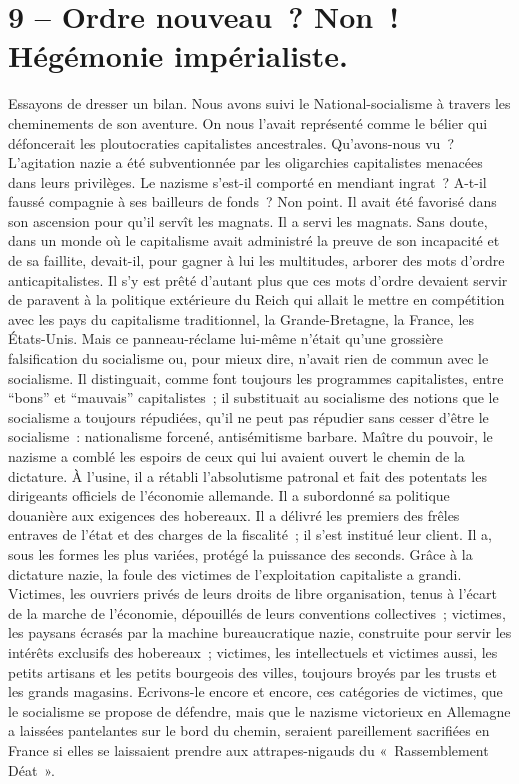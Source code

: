 \documentclass[french,twoside]{book} %
\newcommand\chapteropen{} %
\newcommand\chaptercont{} %
\begin{document}
\chapteropen
\chapter[{9 – Ordre nouveau ? Non ! Hégémonie impérialiste.}]{9 – Ordre nouveau ? Non ! Hégémonie impérialiste.}\renewcommand{\leftmark}{9 – Ordre nouveau ? Non ! Hégémonie impérialiste.}


\chaptercont
\noindent Essayons de dresser un bilan. Nous avons suivi le National-socialisme à travers les cheminements de son aventure. On nous l’avait représenté comme le bélier qui défoncerait les ploutocraties capitalistes ancestrales. Qu’avons-nous vu ? L’agitation nazie a été subventionnée par les oligarchies capitalistes menacées dans leurs privilèges. Le nazisme s’est-il comporté en mendiant ingrat ? A-t-il faussé compagnie à ses bailleurs de fonds ? Non point. Il avait été favorisé dans son ascension pour qu’il servît les magnats. Il a servi les magnats. Sans doute, dans un monde où le capitalisme avait administré la preuve de son incapacité et de sa faillite, devait-il, pour gagner à lui les multitudes, arborer des mots d’ordre anticapitalistes. Il s’y est prêté d’autant plus que ces mots d’ordre devaient servir de paravent à la politique extérieure du Reich qui allait le mettre en compétition avec les pays du capitalisme traditionnel, la Grande-Bretagne, la France, les États-Unis. Mais ce panneau-réclame lui-même n’était qu’une grossière falsification du socialisme ou, pour mieux dire, n’avait rien de commun avec le socialisme. Il distinguait, comme font toujours les programmes capitalistes, entre “bons” et “mauvais” capitalistes ; il substituait au socialisme des notions que le socialisme a toujours répudiées, qu’il ne peut pas répudier sans cesser d’être le socialisme : nationalisme forcené, antisémitisme barbare. Maître du pouvoir, le nazisme a comblé les espoirs de ceux qui lui avaient ouvert le chemin de la dictature. À l’usine, il a rétabli l’absolutisme patronal et fait des potentats les dirigeants officiels de l’économie allemande. Il a subordonné sa politique douanière aux exigences des hobereaux. Il a délivré les premiers des frêles entraves de l’état et des charges de la fiscalité ; il s’est institué leur client. Il a, sous les formes les plus variées, protégé la puissance des seconds. Grâce à la dictature nazie, la foule des victimes de l’exploitation capitaliste a grandi. Victimes, les ouvriers privés de leurs droits de libre organisation, tenus à l’écart de la marche de l’économie, dépouillés de leurs conventions collectives ; victimes, les paysans écrasés par la machine bureaucratique nazie, construite pour servir les intérêts exclusifs des hobereaux ; victimes, les intellectuels et victimes aussi, les petits artisans et les petits bourgeois des villes, toujours broyés par les trusts et les grands magasins. Ecrivons-le encore et encore, ces catégories de victimes, que le socialisme se propose de défendre, mais que le nazisme victorieux en Allemagne a laissées pantelantes sur le bord du chemin, seraient pareillement sacrifiées en France si elles se laissaient prendre aux attrapes-nigauds du « Rassemblement Déat ».\par
\end{document}
